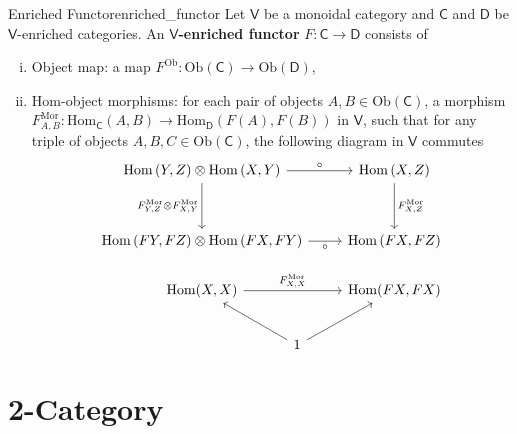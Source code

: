 \begin{definition}{Enriched Functor}{enriched_functor}
    Let $\mathsf{V}$ be a monoidal category and $\mathsf{C}$ and $\mathsf{D}$ be $\mathsf{V}$-enriched categories. An \textbf{$\mathsf{V}$-enriched functor} $F:\mathsf{C}\to\mathsf{D}$ consists of
    \begin{enumerate}[(i)]
        \item Object map: a map $F^{\mathrm{Ob}}:\mathrm{Ob}(\mathsf{C})\to \mathrm{Ob}(\mathsf{D})$,
        \item $\mathrm{Hom}$-object morphisms: for each pair of objects $A,B\in \mathrm{Ob}(\mathsf{C})$, a morphism $F^{\mathrm{Mor}}_{A,B}:\mathrm{Hom}_{\mathsf{C}}(A,B)\to \mathrm{Hom}_{\mathsf{D}}(F(A),F(B))$ in $\mathsf{V}$, such that for any triple of objects $A,B,C\in \mathrm{Ob}(\mathsf{C})$, the following diagram in $\mathsf{V}$ commutes
        \[
            \begin{tikzcd}[ampersand replacement=\&, column sep=small]
                {\mathrm{Hom}\left(Y,Z\right)\otimes \mathrm{Hom}\left(X,Y\right)} \arrow[rr, "\circ"] \arrow[d, "{F^{\mathrm{Mor}}_{Y,Z}\otimes F^{\mathrm{Mor}}_{X,Y}}"'] \& \& {\mathrm{Hom}\left(X,Z\right)} \arrow[d, "{F^{\mathrm{Mor}}_{X,Z}}"] \\[+15pt]
                {\mathrm{Hom}\left(FY,FZ\right)\otimes \mathrm{Hom}\left(FX,FY\right)} \arrow[rr, "\circ"'] \& \& {\mathrm{Hom}\left(FX,FZ\right)} \\
                {\mathrm{Hom}(X,X)} \arrow[rr, "{F^{\mathrm{Mor}}_{X, X}}"] \& \& {\mathrm{Hom}(FX,FX)} \\[+15pt]
                \& |[xshift=-2em,overlay]| 1 \arrow[ur] \arrow[ul] \&
            \end{tikzcd}
        \]
    \end{enumerate}
\end{definition}


\section{2-Category}

